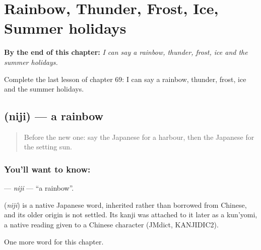
\chapter{Rainbow, Thunder, Frost, Ice, Summer holidays}
\label{ch:ja-rainbow-thunder-frost-ice-summer-holidays}

\begin{chapteropening}
\textbf{By the end of this chapter:} \emph{I can say a rainbow, thunder, frost, ice and the summer holidays.}

Complete the last lesson of chapter 69: I can say a rainbow, thunder, frost, ice and the summer holidays.
\end{chapteropening}

\section[\texorpdfstring{\ja{にじ} (niji)}{にじ (niji)}]{ (niji) — a rainbow}

\label{lesson:JA-C69-niji}



\begin{quote}
Before the new one: say the Japanese for a harbour, then the Japanese for the setting sun.
\end{quote}

\subsection*{You'll want to know: }
\textbf{} — \emph{niji} — \textquotedblleft{}a rainbow\textquotedblright{}.

\begin{cousinweb}
\textbf{} (\emph{niji}) is a native Japanese word, inherited rather than borrowed from Chinese, and its older origin is not settled. Its kanji was attached to it later as a kun'yomi, a native reading given to a Chinese character (JMdict, KANJIDIC2).
\end{cousinweb}

\begin{grammarlens}[title={What you've built}]
One more word for this chapter.
\end{grammarlens}

